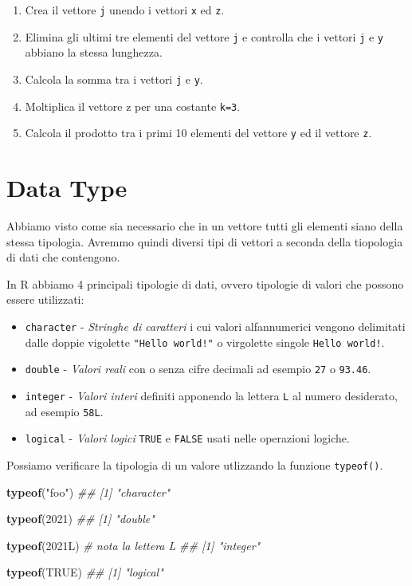 \documentclass[
]{book}
\newenvironment{Shaded}{\begin{snugshade}}{\end{snugshade}}
\newcommand{\CommentTok}[1]{\textcolor[rgb]{0.56,0.35,0.01}{\textit{#1}}}
\newcommand{\DecValTok}[1]{\textcolor[rgb]{0.00,0.00,0.81}{#1}}
\newcommand{\KeywordTok}[1]{\textcolor[rgb]{0.13,0.29,0.53}{\textbf{#1}}}
\newcommand{\NormalTok}[1]{#1}
\newcommand{\OtherTok}[1]{\textcolor[rgb]{0.56,0.35,0.01}{#1}}
\newcommand{\StringTok}[1]{\textcolor[rgb]{0.31,0.60,0.02}{#1}}
\providecommand{\tightlist}{%
  \setlength{\itemsep}{0pt}\setlength{\parskip}{0pt}}
\begin{document}
\begin{enumerate}
\def\labelenumi{\arabic{enumi}.}
\tightlist
\item
  Crea il vettore \texttt{j} unendo i vettori \texttt{x} ed \texttt{z}.
\item
  Elimina gli ultimi tre elementi del vettore \texttt{j} e controlla che i vettori \texttt{j} e \texttt{y} abbiano la stessa lunghezza.
\item
  Calcola la somma tra i vettori \texttt{j} e \texttt{y}.
\item
  Moltiplica il vettore z per una costante \texttt{k=3}.
\item
  Calcola il prodotto tra i primi 10 elementi del vettore \texttt{y} ed il vettore \texttt{z}.
\end{enumerate}

\hypertarget{data-type}{%
\section{Data Type}\label{data-type}}

Abbiamo visto come sia necessario che in un vettore tutti gli elementi siano della stessa tipologia. Avremmo quindi diversi tipi di vettori a seconda della tiopologia di dati che contengono.

In R abbiamo 4 principali tipologie di dati, ovvero tipologie di valori che possono essere utilizzati:

\begin{itemize}
\tightlist
\item
  \texttt{character} - \emph{Stringhe di caratteri} i cui valori alfannumerici vengono delimitati dalle doppie vigolette \texttt{"Hello\ world!"} o virgolette singole \texttt{\textquotesingle{}Hello\ world!\textquotesingle{}}.
\item
  \texttt{double} - \emph{Valori reali} con o senza cifre decimali ad esempio \texttt{27} o \texttt{93.46}.
\item
  \texttt{integer} - \emph{Valori interi} definiti apponendo la lettera \texttt{L} al numero desiderato, ad esempio \texttt{58L}.
\item
  \texttt{logical} - \emph{Valori logici} \texttt{TRUE} e \texttt{FALSE} usati nelle operazioni logiche.
\end{itemize}

Possiamo verificare la tipologia di un valore utlizzando la funzione \texttt{typeof()}.

\begin{Shaded}
\begin{Highlighting}[]
\KeywordTok{typeof}\NormalTok{(}\StringTok{"foo"}\NormalTok{) }
\CommentTok{## [1] "character"}

\KeywordTok{typeof}\NormalTok{(}\DecValTok{2021}\NormalTok{)}
\CommentTok{## [1] "double"}

\KeywordTok{typeof}\NormalTok{(2021L) }\CommentTok{# nota la lettera L}
\CommentTok{## [1] "integer"}

\KeywordTok{typeof}\NormalTok{(}\OtherTok{TRUE}\NormalTok{)}
\CommentTok{## [1] "logical"}
\end{Highlighting}
\end{Shaded}
\end{document}

